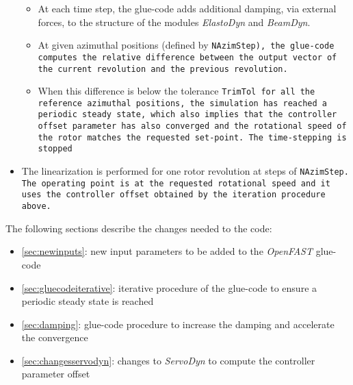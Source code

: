 \documentclass[11pt]{article}
\begin{document}
\begin{itemize}
\begin{itemize}
    \item At each time step, the glue-code adds additional damping, via external forces, to the structure of the modules \textit{ElastoDyn} and \textit{BeamDyn}.
    \item At given azimuthal positions (defined by \tt{NAzimStep}), the glue-code computes the relative difference between the output vector of the current revolution and the previous revolution.
    \item When this difference is below the tolerance \tt{TrimTol} for all the reference azimuthal positions, the simulation has reached a periodic steady state, which also implies that the controller offset parameter has also converged and the rotational speed of the rotor matches the requested set-point. The time-stepping is stopped
    \end{itemize}
    \item  The linearization is performed for one rotor revolution at steps of \tt{NAzimStep}. The operating point is at the requested rotational speed and it uses the controller offset obtained by the iteration procedure above.
\end{itemize}


The following sections describe the changes needed to the code:
\begin{itemize}
    \item \autoref{sec:newinputs}: new input parameters to be added to the \textit{OpenFAST} glue-code
    \item \autoref{sec:gluecodeiterative}: iterative procedure of the glue-code to ensure a periodic steady state is reached
    \item \autoref{sec:damping}: glue-code procedure to increase the damping and accelerate the convergence
    \item \autoref{sec:changesservodyn}: changes to \textit{ServoDyn} to compute the controller parameter offset
\end{itemize}
\end{document}
